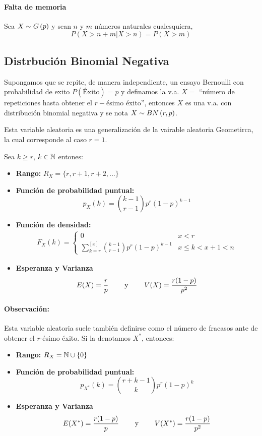 \paragraph{Falta de memoria}
Sea $X\sim G\left(p\right)$ y sean $n$ y $m$ números naturales cualesquiera, $$P(X > n+m | X > n) = P(X > m)$$

\subsection{Distrbución Binomial Negativa}

Supongamos que se repite, de manera independiente, un ensayo Bernoulli con probabilidad de exito $P(\text{Éxito}) = p$ y definamos la
v.a. $X=$ ``número de repeticiones hasta obtener el $r-$ésimo éxito'', entonces $X$ es una v.a. con distribución binomial negativa
y se nota $X\sim BN\left(r,p\right)$. 

Esta variable aleatoria es una generalización de la vairable aleatoria Geometirca, la cual corresponde al caso $r=1$.

Sea $k \geq r$, $k\in\mathbb{N}$ entones:

\begin{itemize}
\item \textbf{Rango:} $R_X = \{r, r+1, r+2, ...\}$
\item \textbf{Función de probabilidad puntual:} 
$$p_X(k) = \binom{k-1}{r-1}p^r(1-p)^{k-1}$$
\item \textbf{Función de densidad:}\begin{align*}
F_X(k) = \left\{ \begin{array}{ll}
	0 & x < r \\
	\sum\limits_{k=r}^{[x]}\binom{k-1}{r-1}p^r(1-p)^{k-1} & x \leq k < x+1 < n
\end{array}
\right.
\end{align*}
\item \textbf{Esperanza y Varianza}
$$E(X) = \frac{r}{p} \hspace*{8mm}\text{y}\hspace*{8mm} V(X) = \frac{r(1-p)}{p^2}$$
\end{itemize}

\paragraph{Observación:} Esta variable aleatoria suele también definirse como el número de fracasos ante de obtener el $r$-ésimo éxito. Si la denotamos $X^*$, entonces:
\begin{itemize}
\item \textbf{Rango:} $R_X = \mathbb{N}\cup \{0\}$
\item \textbf{Función de probabilidad puntual:} 
$$p_{X^*}(k) = \binom{r+k-1}{k}p^r(1-p)^{k}$$
\item \textbf{Esperanza y Varianza}
$$E(X^*) = \frac{r(1-p)}{p} \hspace*{8mm}\text{y}\hspace*{8mm} V(X^*) = \frac{r(1-p)}{p^2}$$
\end{itemize}

